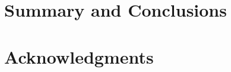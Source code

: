 \documentclass[fleqn,10pt]{SelfArx} %
\begin{document}
\bigskip
\bigskip
\section{Summary and Conclusions}
\bigskip
\bigskip
\bigskip



\section*{Acknowledgments} %







\end{document}
